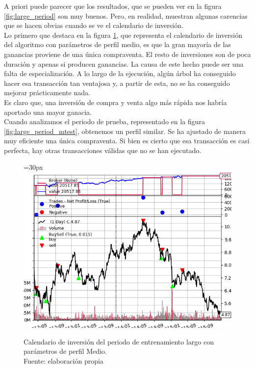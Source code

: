 A priori puede parecer que los resultados, que se pueden ver en la figura \ref{fig:large_period} son muy buenos. Pero, en realidad, muestran algunas carencias que se hacen obvias cuando se ve el calendario de inversi\'on.\\

Lo primero que destaca en la figura \ref{fig:large_period_mtrain}, que representa el calendario de inversi\'on del algoritmo con par\'ametros de perfil medio, es que la gran mayor\'ia de las ganancias proviene de una \'unica compraventa. El resto de inversiones son de poca duraci\'on y apenas si producen ganancias. La causa de este hecho puede ser una falta de especializaci\'on. A lo largo de la ejecuci\'on, alg\'un \'arbol ha conseguido hacer esa transacci\'on tan ventajosa y, a partir de esta, no se ha conseguido mejorar pr\'acticamente nada.\\

Es claro que, una inversi\'on de compra y venta algo m\'as r\'apida nos habr\'ia aportado una mayor ganacia.\\

Cuando analizamos el periodo de prueba, representado en la figura \ref{fig:large_period_mtest}, obtenemos un perfil similar. Se ha ajustado de manera muy eficiente una \'unica compraventa. Si bien es cierto que esa transacci\'on es casi perfecta, hay otras transacciones v\'alidas que no se han ejecutado.\\

     	\begin{figure}[H]
     		\centering\leftskip=30px
     		\includegraphics[scale=0.75]{imagenes/L_Medium_train.png}
     		\caption[Calendario de inversi\'on del periodo de entrenamiento largo.]{Calendario de inversi\'on del periodo de entrenamiento largo con par\'ametros de perfil Medio.\\ Fuente: elaboraci\'on propia}
     		\label{fig:large_period_mtrain}
     	\end{figure}
     	
